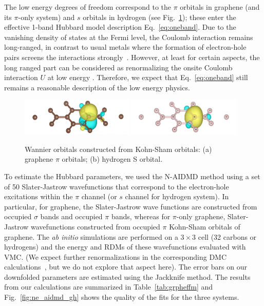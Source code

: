 The low energy degrees of freedom correspond to the $\pi$ orbitals in graphene (and its $\pi$-only system) 
and $s$ orbitals in hydrogen (see Fig.~\ref{fig:honeycomb_wan}); these enter the effective 
1-band Hubbard model description Eq.~\eqref{eq:oneband}. Due to the vanishing density of states at 
the Fermi level, the Coulomb interaction remains long-ranged, in contrast to usual 
metals where the formation of electron-hole pairs screens the interactions strongly~\cite{Zheng2016}. 
However, at least for certain aspects, the long ranged part can be considered as renormalizing the 
onsite Coulomb interaction $U$ at low energy \cite{Schuler2013, Changlani2015}. 
Therefore, we expect that Eq.~\eqref{eq:oneband} still remains a reasonable description of the low energy physics. 
\begin{figure}[hbt]
\includegraphics[width=0.48\textwidth]{./Figures/c_pi.png}
\includegraphics[width=0.48\textwidth]{./Figures/h_wan.png}
\caption{Wannier orbitals constructed from Kohn-Sham orbitals: (a) graphene $\pi$ orbitals; (b) hydrogen S orbital. }
\label{fig:honeycomb_wan}
\end{figure}

To estimate the Hubbard parameters, we used the N-AIDMD method using a set of 50 Slater-Jastrow wavefunctions that correspond 
to the electron-hole excitations within the $\pi$ channel (or $s$ channel for hydrogen system). In particular, for graphene, 
the Slater-Jastrow wave functions are constructed from occupied $\sigma$ bands and occupied $\pi$ bands, whereas for $\pi$-only graphene, 
Slater-Jastrow wavefunctions constructed from occupied $\pi$ Kohn-Sham orbitals of graphene. The \textit{ab initio} simulations 
are performed on a $3\times3$ cell (32 carbons or hydrogens) and the energy and RDMs of these wavefunctions 
evaluated with VMC. (We expect further renormalizations in the corresponding DMC calculations~\cite{Changlani2015}, 
but we do not explore that aspect here). The error bars on our downfolded parameters are estimated using the Jackknife method. 
The results from our calculations are summarized in Table~\ref{tab:grpheffm} 
and Fig.~\ref{fig:ne_aidmd_gh} shows the quality of the fits for the three systems.

